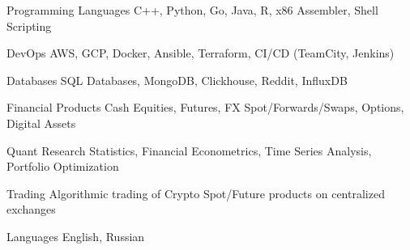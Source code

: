 

\begin{cvskills}

  \cvskill
    {Programming Languages} %
    {C++, Python, Go, Java, R, x86 Assembler, Shell Scripting} %

  \cvskill
    {DevOps} %
    {AWS, GCP, Docker, Ansible, Terraform, CI/CD (TeamCity, Jenkins)} %

  \cvskill
    {Databases} %
    {SQL Databases, MongoDB, Clickhouse, Reddit, InfluxDB} %

  \cvskill
    {Financial Products} %
    {Cash Equities, Futures, FX Spot/Forwards/Swaps, Options, Digital Assets} %

  \cvskill
    {Quant Research} %
    {Statistics, Financial Econometrics, Time Series Analysis, Portfolio Optimization} %

  \cvskill
    {Trading} %
    {Algorithmic trading of Crypto Spot/Future products on centralized exchanges} %

  \cvskill
    {Languages} %
    {English, Russian} %

\end{cvskills}
